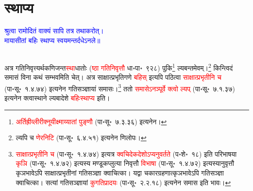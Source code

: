 \section[स्थाप्य]{स्थाप्य}
\centering\textcolor{blue}{श्रुत्वा रामोदितं वाक्यं सापि तत्र तथाकरोत्।\nopagebreak\\
मायासीतां बहिः स्थाप्य स्वयमन्तर्दधेऽनले॥}\nopagebreak\\
\\
\begin{sloppypar}\justifying\noindent\hspace{10mm} अत्र गति\-निवृत्त्यर्थक\-णिजन्त\-\textcolor{red}{स्था}\-धातोः (\textcolor{red}{ष्ठा गतिनिवृत्तौ} धा॰पा॰~९२८) पुकि\footnote{\textcolor{red}{अर्ति\-ह्रीव्ली\-रीक्नूयी\-क्ष्माय्यातां पुङ्णौ} (पा॰सू॰~७.३.३६) इत्यनेन।} ल्यबन्तमेवम्।\footnote{ल्यपि च \textcolor{red}{णेरनिटि} (पा॰सू॰~६.४.५१) इत्यनेन णिलोपः।} किन्त्विदं समासं विना कथं सम्भवमिति चेत्।
अत्र साक्षात्प्रभृति\-गणे \textcolor{red}{बहिस्} इत्यपि पठित्वा \textcolor{red}{साक्षात्प्रभृतीनि च} (पा॰सू॰~१.४.७४) इत्यनेन गतिसञ्ज्ञायां समासः।\footnote{\textcolor{red}{साक्षात्प्रभृतीनि च} (पा॰सू॰~१.४.७४) इत्यत्र \textcolor{red}{क्वचिदेक\-देशोऽप्यनुवर्तते} (प॰शे॰~१८) इति परिभाषया \textcolor{red}{कृञि} (पा॰सू॰~१.४.७२) इत्यस्य मण्डूक\-प्लुत्या निवृत्तौ \textcolor{red}{विभाषा} (पा॰सू॰~१.४.७२) इत्यस्यानुवृत्तौ कृञभावेऽपि साक्षात्प्रभृतीनां गति\-सञ्ज्ञा क्वाचित्का। यद्वा चकार\-ग्रहणात्कृञभावेऽपि गति\-सञ्ज्ञा क्वाचित्का। सत्यां गतिसञ्ज्ञायां \textcolor{red}{कुगतिप्रादयः} (पा॰सू॰~२.२.१८) इत्यनेन समास इति भावः।} ततो \textcolor{red}{समासेऽनञ्पूर्वे क्त्वो ल्यप्} (पा॰सू॰~७.१.३७) इत्यनेन क्त्वा\-स्थाने ल्यबादेशे \textcolor{red}{बहिःस्थाप्य} इति।\end{sloppypar}
